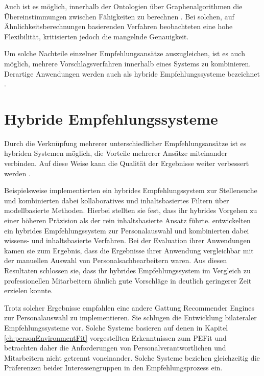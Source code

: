 Auch ist es möglich, innerhalb der Ontologien über Graphenalgorithmen die Übereinstimmungen zwischen Fähigkeiten zu berechnen \cite[S. 1f.]{balachander:2018}. Bei solchen, auf Ähnlichkeitsberechnungen basierenden Verfahren beobachteten \textcite[S. 4]{bianchini:2008} eine hohe Flexibilität, kritisierten jedoch die mangelnde Genauigkeit.

Um solche Nachteile einzelner Empfehlungsansätze auszugleichen, ist es auch möglich, mehrere Vorschlagsverfahren innerhalb eines Systems zu kombinieren. Derartige Anwendungen werden auch als hybride Empfehlungssysteme bezeichnet \cite[S. 200]{recommenderSystems:2016}.

\section{Hybride Empfehlungssysteme}
\label{ch:empfehlungssysteme:hybrideEmpfehlungssysteme}
Durch die Verknüpfung mehrerer unterschiedlicher Empfehlungsansätze ist es hybriden Systemen möglich, die Vorteile mehrerer Ansätze miteinander verbinden. Auf diese Weise kann die Qualität der Ergebnisse weiter verbessert werden \cite[S. 199f.]{recommenderSystems:2016}\cite[S. 8]{malinowski:2008}.

Beispielsweise implementierten \textcite[S. 1ff.]{combiningCbAndCFCostSensitiveApproach:2017} ein hybrides Empfehlungssystem zur Stellensuche und kombinierten dabei kollaboratives und inhaltsbasiertes Filtern über modellbasierte Methoden. Hierbei stellten sie fest, dass ihr hybrides Vorgehen zu einer höheren Präzision als der rein inhaltsbasierte Ansatz führte. \textcite[S. 1ff.]{mohamed:2018} entwickelten ein hybrides Empfehlungssystem zur Personalauswahl und kombinierten dabei wissens- und inhaltsbasierte Verfahren. Bei der Evaluation ihrer Anwendungen kamen sie zum Ergebnis, dass die Ergebnisse ihrer Anwendung vergleichbar mit der manuellen Auswahl von Personalsachbearbeitern waren. Aus diesen Resultaten schlossen sie, dass ihr hybrides Empfehlungssystem im Vergleich zu professionellen Mitarbeitern ähnlich gute Vorschläge in deutlich geringerer Zeit erzielen konnte.

Trotz solcher Ergebnisse empfahlen \textcite[S. 1ff.]{malinowski:2006} eine andere Gattung Recommender Engines zur Personalauswahl zu implementieren. Sie schlugen die Entwicklung bilateraler Empfehlungssysteme vor. Solche Systeme basieren auf denen in Kapitel \ref{ch:personEnvironmentFit} vorgestellten Erkenntnissen zum \ac{PEFit} und betrachten daher die Anforderungen von Personalverantwortlichen und Mitarbeitern nicht getrennt voneinander. Solche Systeme beziehen gleichzeitig die Präferenzen beider Interessengruppen in den Empfehlungsprozess ein.
